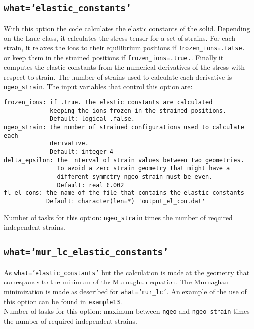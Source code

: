 \documentclass[12pt,a4paper]{article}
\begin{document}
\subsection{\texttt{what='elastic\_constants'}}
With this option the code calculates the elastic constants of the solid.
Depending on the Laue class, it calculates the stress tensor for a set of 
strains. For each strain, it relaxes the ions to their 
equilibrium positions if \texttt{frozen\_ions=.false.} or keep them
in the strained positions if \texttt{frozen\_ions=.true.}. 
Finally it computes the elastic constants from the numerical derivatives 
of the stress with respect to strain.
The number of strains used to calculate each derivative 
is \texttt{ngeo\_strain}. The input variables that control this option are:
\begin{verbatim}
frozen_ions: if .true. the elastic constants are calculated 
             keeping the ions frozen in the strained positions. 
             Default: logical .false.
ngeo_strain: the number of strained configurations used to calculate each
             derivative. 
             Default: integer 4
delta_epsilon: the interval of strain values between two geometries.
               To avoid a zero strain geometry that might have a
               different symmetry ngeo_strain must be even.
               Default: real 0.002
fl_el_cons: the name of the file that contains the elastic constants
            Default: character(len=*) 'output_el_con.dat'

\end{verbatim}
Number of tasks for this option: \texttt{ngeo\_strain} times the number of
required independent strains.

\subsection{\texttt{what='mur\_lc\_elastic\_constants'}}
As \texttt{what='elastic\_constants'} but the calculation is made at the
geometry that corresponds to the minimum of the Murnaghan equation. The
Murnaghan minimization is made as described for \texttt{what='mur\_lc'}.
An example of the use of this option can be found in \texttt{example13}. \\
Number of tasks for this option: maximum between \texttt{ngeo} and
\texttt{ngeo\_strain} times the number of required independent strains.
\end{document}
